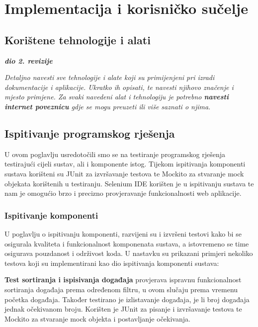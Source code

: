 \chapter{Implementacija i korisničko sučelje}
		
		
		\section{Korištene tehnologije i alati}
		
			\textbf{\textit{dio 2. revizije}}
			
			 \textit{Detaljno navesti sve tehnologije i alate koji su primijenjeni pri izradi dokumentacije i aplikacije. Ukratko ih opisati, te navesti njihovo značenje i mjesto primjene. Za svaki navedeni alat i tehnologiju je potrebno \textbf{navesti internet poveznicu} gdje se mogu preuzeti ili više saznati o njima}.
			
			
			\eject 
		
	
		\section{Ispitivanje programskog rješenja}
			
			U ovom poglavlju usredotočili smo se na testiranje programskog rješenja testirajući cijeli sustav, ali i komponente istog. Tijekom ispitivanja komponenti sustava korišteni su JUnit za izvršavanje testova te Mockito za stvaranje mock objekata korištenih u testiranju. Selenium IDE korišten je u ispitivanju sustava te nam je omogućio brzo i precizno provjeravanje funkcionalnosti web aplikacije.
			
			\subsection{Ispitivanje komponenti}
			
			U poglavlju o ispitivanju komponenti, razvijeni su i izvršeni testovi kako bi se osigurala kvaliteta i funkcionalnost komponenata sustava, a istovremeno se time osigurava pouzdanost i održivost koda. U nastavku su prikazani primjeri nekoliko testova koji su implementirani kao dio ispitivanja komponenti sustava:

			\textbf{Test sortiranja i ispisivanja događaja} provjerava ispravnu funkcionalnost sortiranja događaja prema određenom filtru, u ovom slučaju prema vremenu početka događaja. Također testirano je izlistavanje događaja, je li broj događaja jednak očekivanom broju. Korišten je JUnit za pisanje i izvršavanje testova te Mockito za stvaranje mock objekta i postavljanje očekivanja.


